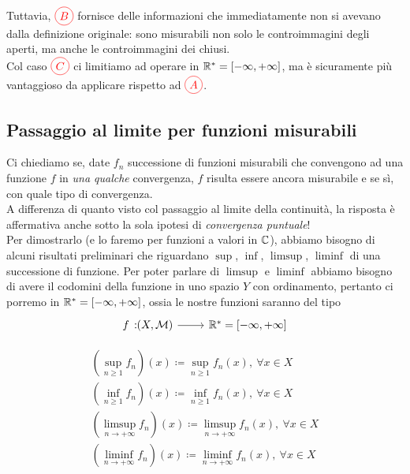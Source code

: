 Tuttavia, $\textcolor{red}{\circled{B}}$ fornisce delle informazioni che immediatamente non si avevano dalla definizione originale: sono misurabili non solo le controimmagini degli aperti, ma anche le controimmagini dei chiusi.\\
Col caso $\textcolor{red}{\circled{C}}$ ci limitiamo ad operare in $\mathbb{R}^{\ast}=\left[-\infty,+\infty\right]$, ma è sicuramente più vantaggioso da applicare rispetto ad $\textcolor{red}{\circled{A}}$.
\subsection{Passaggio al limite per funzioni misurabili}
Ci chiediamo se, date $f_n$ successione di funzioni misurabili che convengono ad una funzione $f$ in \textit{una qualche} convergenza, $f$ risulta essere ancora misurabile e se sì, con quale tipo di convergenza.\\
A differenza di quanto visto col passaggio al limite della continuità, la risposta è affermativa anche sotto la sola ipotesi di \textit{convergenza puntuale}!\\
Per dimostrarlo (e lo faremo per funzioni a valori in $\mathbb{C}$), abbiamo bisogno di alcuni risultati preliminari che riguardano $\sup$, $\inf$, $\limsup$, $\liminf$ di una successione di funzione. Per poter parlare di $\limsup$ e $\liminf$ abbiamo bisogno di avere il codomini della funzione in uno spazio $Y$ con ordinamento, pertanto ci porremo in  $\mathbb{R}^{\ast}=\left[-\infty,+\infty\right]$, ossia le nostre funzioni saranno del tipo
\begin{equation*}
\funz{f}{\left(X,\mathcal{M}\right)}{\realset^{\ast}=\left[-\infty,+\infty\right]}
\end{equation*}
\begin{defines}
\begin{gather*}
	\left(\sup_{n\geq 1} f_n\right)\left(x\right)\coloneqq \sup_{n\geq 1}f_n\left(x\right),\ \forall x\in X\\
	\left(\inf_{n\geq 1} f_n\right)\left(x\right)\coloneqq \inf_{n\geq 1}f_n\left(x\right),\ \forall x\in X\\
	\left(\limsup_{n\to+\infty} f_n\right)\left(x\right)\coloneqq \limsup_{n\to+\infty}f_n\left(x\right),\ \forall x\in X\\
	\left(\liminf_{n\to+\infty} f_n\right)\left(x\right)\coloneqq \liminf_{n\to+\infty}f_n\left(x\right),\ \forall x\in X
\end{gather*}
\end{defines}
